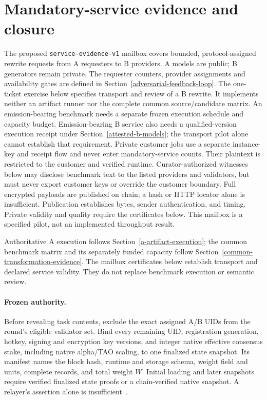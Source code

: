\section{Mandatory-service evidence and closure}\label{service-evidence}

The proposed \texttt{service-evidence-v1} mailbox covers bounded,
protocol-assigned rewrite requests from A requesters to B providers.
A models are public; B generators remain private. The requester counters,
provider assignments and availability gates are defined in
Section~\ref{adversarial-feedback-loop}. The one-ticket exercise below specifies
transport and review of a B rewrite. It implements neither an artifact runner nor the
complete common source/candidate matrix. An emission-bearing benchmark
needs a separate frozen execution schedule and capacity budget.
Emission-bearing B service also needs a qualified-version execution
receipt under Section~\ref{attested-b-models}; the transport pilot alone
cannot establish that requirement. Private customer jobs use a separate
instance-key and receipt flow and never enter mandatory-service counts.
Their plaintext is restricted to the customer and verified runtime.
Curator-authorized witnesses below may disclose benchmark text to the
listed providers and validators, but must never export customer keys
or override the customer boundary.
Full encrypted payloads
are published on chain; a hash or HTTP locator alone is insufficient.
Publication establishes bytes, sender authentication, and timing. Private
validity and quality require the certificates below. This mailbox is a
specified pilot, not an implemented throughput result.

Authoritative A execution follows Section~\ref{a-artifact-execution};
the common benchmark matrix and its separately funded capacity follow
Section~\ref{common-transformation-evidence}. The mailbox certificates
below establish transport and declared service validity. They do not
replace benchmark execution or semantic review.

\paragraph{Frozen authority.}
Before revealing task contents, exclude the exact assigned A/B UIDs from
the round's eligible validator set. Bind every remaining UID, registration
generation, hotkey, signing and encryption key versions, and integer native
effective consensus stake, including native alpha/TAO scaling, to one
finalized state snapshot. Its manifest names the block hash, runtime and
storage schema, weight field and units, complete records, and total weight
\(W\). Initial loading and later snapshots require verified finalized state
proofs or a chain-verified native snapshot. A relayer's assertion alone is
insufficient~\cite{btprecompilelifecycle}.

